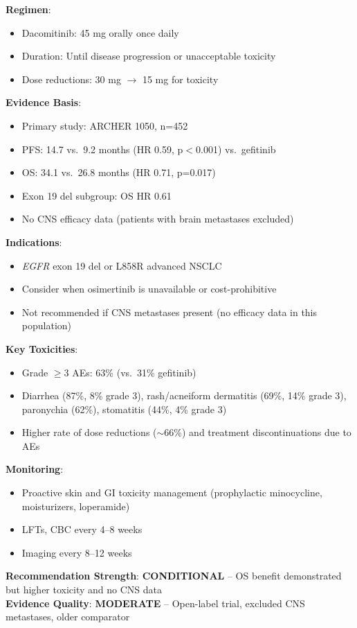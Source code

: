 \documentclass[10pt,letterpaper]{article}
\begin{document}
\begin{tcolorbox}[enhanced,colback=conditionalyellow!10,colframe=conditionalyellow,
title={\textbf{Option 4: Dacomitinib Monotherapy} \hfill \colorbox{white}{\textbf{CONDITIONAL (2B)}}},
fonttitle=\bfseries\small,coltitle=black]
{\small
\textbf{Regimen}:
\begin{itemize}
\item Dacomitinib: 45 mg orally once daily
\item Duration: Until disease progression or unacceptable toxicity
\item Dose reductions: 30 mg $\rightarrow$ 15 mg for toxicity
\end{itemize}

\textbf{Evidence Basis}:
\begin{itemize}
\item Primary study: ARCHER 1050, n=452
\item PFS: 14.7 vs.~9.2 months (HR 0.59, p$<$0.001) vs.~gefitinib
\item OS: 34.1 vs.~26.8 months (HR 0.71, p=0.017)
\item Exon 19 del subgroup: OS HR 0.61
\item No CNS efficacy data (patients with brain metastases excluded)
\end{itemize}

\textbf{Indications}:
\begin{itemize}
\item \textit{EGFR} exon 19 del or L858R advanced NSCLC
\item Consider when osimertinib is unavailable or cost-prohibitive
\item Not recommended if CNS metastases present (no efficacy data in this population)
\end{itemize}

\textbf{Key Toxicities}:
\begin{itemize}
\item Grade $\geq$3 AEs: 63\% (vs.~31\% gefitinib)
\item Diarrhea (87\%, 8\% grade 3), rash/acneiform dermatitis (69\%, 14\% grade 3), paronychia (62\%), stomatitis (44\%, 4\% grade 3)
\item Higher rate of dose reductions ($\sim$66\%) and treatment discontinuations due to AEs
\end{itemize}

\textbf{Monitoring}:
\begin{itemize}
\item Proactive skin and GI toxicity management (prophylactic minocycline, moisturizers, loperamide)
\item LFTs, CBC every 4--8 weeks
\item Imaging every 8--12 weeks
\end{itemize}

\textbf{Recommendation Strength}: \textbf{CONDITIONAL} -- OS benefit demonstrated but higher toxicity and no CNS data\\
\textbf{Evidence Quality}: \textbf{MODERATE} -- Open-label trial, excluded CNS metastases, older comparator
}
\end{tcolorbox}
\end{document}

